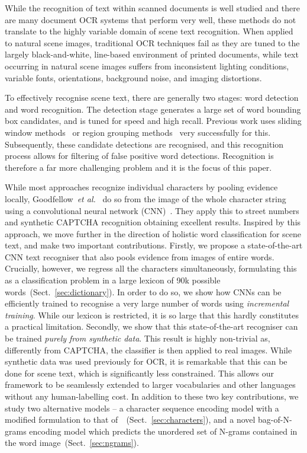 \documentclass{article} \usepackage{nips14submit_e,times}
\newcommand{\sref}[1]{Sect.~\ref{#1}}
\def\etal{\emph{et al.}}
\begin{document}
While the recognition of text within scanned documents is well studied and there are many document OCR systems that perform very well, these methods do not translate to the highly variable domain of scene text recognition. When applied to natural scene images, traditional OCR techniques fail as they are tuned to the largely black-and-white, line-based environment of printed documents, while text occurring in natural scene images suffers from inconsistent lighting conditions, variable fonts, orientations, background noise, and imaging distortions.

To effectively recognise scene text, there are generally two stages: word detection and word recognition. The detection stage generates a large set of word bounding box candidates, and is tuned for speed and high recall. Previous work uses sliding window methods~\cite{Wang11} or region grouping methods~\cite{Chen11,Epshtein10,Neumann12} very successfully for this. Subsequently, these candidate detections are recognised, and this recognition process allows for filtering of false positive word detections. Recognition is therefore a far more challenging problem and it is the focus of this paper.



While most approaches recognize individual characters by pooling evidence locally, Goodfellow~\etal~\cite{Goodfellow13} do so from the image of the whole character string using a convolutional neural network (CNN)~\cite{Lecun98}. They apply this to street numbers and synthetic CAPTCHA recognition obtaining excellent results. Inspired by this approach, we move further in the direction of holistic word classification for scene text, and make two important contributions. Firstly, we propose a state-of-the-art CNN text recogniser that also pools evidence from images of entire words. Crucially, however, we regress all the characters simultaneously, formulating this as a classification problem in a large lexicon of 90k possible words~(\sref{sec:dictionary}). In order to do so, we show how CNNs can be efficiently trained to recognise a very large number of words using \emph{incremental training}. While our lexicon is restricted, it is so large that this hardly constitutes a practical limitation. Secondly, we show that this state-of-the-art recogniser can be trained \emph{purely from synthetic data}. This result is highly non-trivial as, differently from CAPTCHA, the classifier is then applied to real images. While synthetic data was used previously for OCR, it is remarkable that this can be done for scene text, which is significantly less constrained. This allows our framework to be seamlessly extended to larger vocabularies and other languages without any human-labelling cost.
In addition to these two key contributions, we study two alternative models -- a character sequence encoding model with a modified formulation to that of~\cite{Goodfellow13}~(\sref{sec:characters}), and a novel bag-of-N-grams encoding model which predicts the unordered set of N-grams contained in the word image~(\sref{sec:ngrams}).
\end{document}
